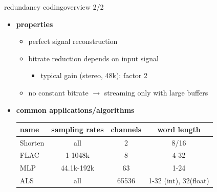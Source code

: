 	\begin{frame}{redundancy coding}{overview 2/2}	
		\begin{itemize}
			\item	\textbf{properties}
				\begin{itemize}
					\item	perfect signal reconstruction
					\item	bitrate reduction depends on input signal
						\begin{itemize}
							\item	typical gain (stereo, 48k): factor 2
						\end{itemize}
					\item	no constant bitrate $\rightarrow$ streaming only with large buffers
				\end{itemize}
			\pause
            \bigskip
			\item	\textbf{common applications/algorithms}
			\begin{table}
			\centering
				\begin{footnotesize}
					\begin{tabular}{lccc}
					\hline
						\textbf{name} & \textbf{sampling rates}	& \textbf{channels}	& \textbf{word length} \\
					\hline
					Shorten	& all 			& 2 	& 8/16\\
					FLAC 	& 1-1048k 		& 8 	& 4-32\\
					MLP 	& 44.1k-192k	& 63 	& 1-24\\
					ALS 	& all 			& 65536	& 1-32 (int), 32(float)\\
					\end{tabular}  
				\end{footnotesize}
			\end{table}
		\end{itemize}		
	\end{frame}

	
	



